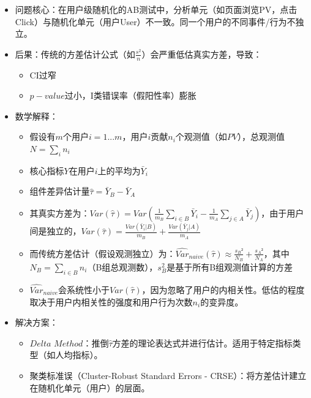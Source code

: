 \documentclass[
  letterpaper,
  DIV=11,
  numbers=noendperiod]{scrreprt}
\begin{document}
\begin{itemize}
\item
  问题核心：在用户级随机化的AB测试中，分析单元（如页面浏览PV，点击Click）与随机化单元（用户User）不一致。同一个用户的不同事件/行为不独立。
\item
  后果：传统的方差估计公式（如\(\frac{s^2}{n}\)）会严重低估真实方差，导致：

  \begin{itemize}
  \item
    CI过窄
  \item
    \(p-value\)过小，I类错误率（假阳性率）膨胀
  \end{itemize}
\item
  数学解释：

  \begin{itemize}
  \item
    假设有\(m\)个用户\(i = 1...m\)，用户\(i\)贡献\(n_i\)个观测值（如\(PV\)），总观测值\(N = \sum_i n_i\)
  \item
    核心指标\(Y\)在用户\(i\)上的平均为\(\bar{Y}_i\)
  \item
    组件差异估计量\(\hat{\tau} = \bar{Y}_B - \bar{Y}_A\)
  \item
    其真实方差为：\(Var(\hat{τ}) = Var(\frac{1}{m_B} \sum_{i \in B} \bar{Y}_i - \frac{1}{m_A} \sum_{j \in A} \bar{Y}_j)\)，由于用户间是独立的，\(Var(\hat{τ}) = \frac{Var(\bar{Y}_i | B)}{m_B} + \frac{Var(\bar{Y}_j | A)}{m_A}\)
  \item
    而传统方差估计（假设观测独立）为：\(\widehat{Var}_{naive}(\hat{τ}) \approx \frac{s_B²}{N_B} + \frac{s_A²}{N_A}\)，其中\(N_B = \sum_{i \in B} n_i\)（B组总观测数），\(s_B^2\)是基于所有B组观测值计算的方差
  \item
    \(\widehat{Var}_{naive}\)会系统性小于\(Var(\hat{\tau})\)，因为忽略了用户的内相关性。低估的程度取决于用户内相关性的强度和用户行为次数\(n_i\)的变异度。
  \end{itemize}
\item
  解决方案：

  \begin{itemize}
  \item
    \(Delta\)
    \(Method\)：推倒\(\hat{\tau}\)方差的理论表达式并进行估计。适用于特定指标类型（如人均指标）。
  \item
    聚类标准误（Cluster-Robust Standard Errors -
    CRSE）：将方差估计建立在随机化单元（用户）的层面。


\end{itemize}
\end{itemize}
\end{document}

